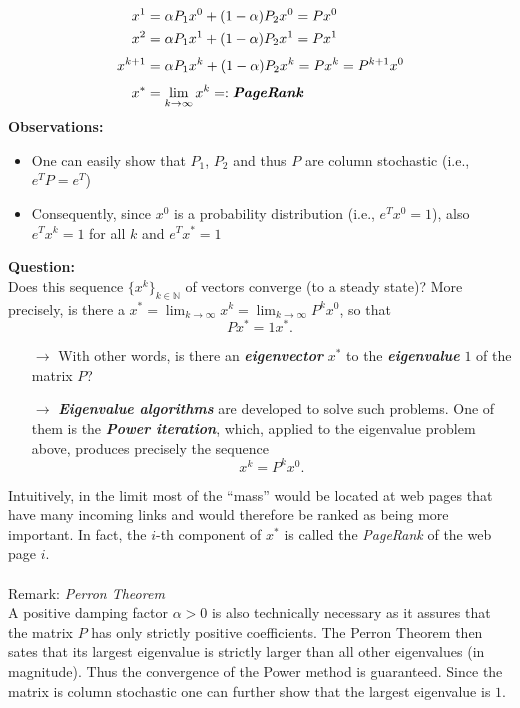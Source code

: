 {\begin{align*}
x^1 &=  \alpha P_1 x^0 + (1-\alpha) P_2 x^0 = Px^0  \\
x^2 &=  \alpha P_1 x^1 + (1-\alpha) P_2 x^1 = Px^1 \\[0.1cm]
x^{k+1} &=  \alpha P_1 x^k + (1-\alpha) P_2 x^k = Px^k = P^{k+1}x^0 \\[0.1cm]
x^* &=  \lim_{k\to \infty} x^k =: \textbf{\textit{PageRank}} 
\end{align*} 
\textbf{Observations:}
\begin{itemize}
	\item One can easily show that $P_1$, $P_2$ and thus $P$ are column stochastic (i.e., $e^TP = e^T$)
	\item Consequently, since $x^0$ is a probability distribution (i.e., $e^Tx^0 = 1$), also $e^Tx^k = 1$ for all $k$ and $e^Tx^*=1$
\end{itemize}

\textbf{Question:} \\
Does this sequence $\{x^k\}_{k \in \mathbb{N}}$ of vectors converge (to a steady state)? More precisely, is there a $x^* = \lim_{k\to \infty} x^k= \lim_{k\to \infty} P^kx^0$, so that
\begin{equation} \label{eq:PageRank_eigprob}
Px^* = 1 x^* .
\end{equation}
\begin{itemize}
	\item[$\rightarrow$] With other words, is there an \textit{\textbf{eigenvector}} $x^*$ to the \textit{\textbf{eigenvalue}} $1$ of the matrix $P$?
	\item[$\rightarrow$]\textit{\textbf{Eigenvalue algorithms}} are developed to solve such problems. One of them is the \textit{\textbf{Power iteration}}, which, applied to the eigenvalue problem above, produces precisely the sequence
	$$x^k = P^k x^0.$$
\end{itemize}
Intuitively, in the limit most of the ``mass'' would be located at web pages that have many incoming links and would therefore be ranked as being more important. In fact, the $i$-th component of $x^*$ is called the \textit{PageRank} of the web page $i$.\\~\\
Remark: \textit{Perron Theorem}\\
A positive damping factor $\alpha>0$ is also technically necessary as it assures that the matrix $P$ has only strictly positive coefficients. The Perron Theorem then sates that its largest eigenvalue is strictly larger than all other eigenvalues (in magnitude). Thus the convergence of the Power method is guaranteed. Since the matrix is column stochastic one can further show that the largest eigenvalue is $1$.
}